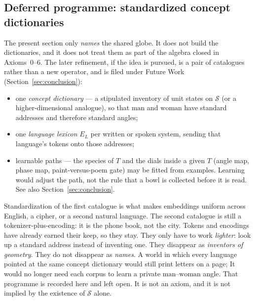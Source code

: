 \documentclass[12pt, a4paper]{article}
\begin{document}
\subsection{Deferred programme: standardized concept dictionaries}
\label{subsec:standard_dictionaries}
The present section only \emph{names} the shared globe. It does not
build the dictionaries, and it does not treat them as part of the
algebra closed in Axioms~0--6. The later refinement, if the idea is
pursued, is a pair of catalogues rather than a new operator, and is
filed under Future Work (Section~\ref{sec:conclusion}):
\begin{itemize}
    \item one \emph{concept dictionary} --- a stipulated inventory of
          unit states on $\mathcal{S}$ (or a higher-dimensional
          analogue), so that $\mathrm{man}$ and $\mathrm{woman}$ have
          standard addresses and therefore standard angles;
    \item one \emph{language lexicon} $E_L$ per written or spoken
          system, sending that language's tokens onto those addresses;
    \item learnable paths --- the species of $T$ and the dials inside
          a given $T$ (angle map, phase map, paint-versus-poem gate)
          may be fitted from examples. Learning would adjust the path,
          not the rule that a bowl is collected before it is read.
          See also Section~\ref{sec:conclusion}.
\end{itemize}
Standardization of the first catalogue is what makes embeddings
uniform across English, a cipher, or a second natural language.
The second catalogue is still a tokenizer-plus-encoding: it is the
phone book, not the city. Tokens and encodings have already earned
their keep, so they stay. They only have to work \emph{lighter}:
look up a standard address instead of inventing one. They disappear as
\emph{inventors of geometry}. They do not disappear as \emph{names}.
A world in which every language pointed at the same concept
dictionary would still print letters on a page; It would no longer need each 
corpus to learn a private $\mathrm{man}$--$\mathrm{woman}$ angle. 
That programme is recorded here and left open. It is not an
axiom, and it is not implied by the existence of $\mathcal{S}$ alone.
\end{document}
